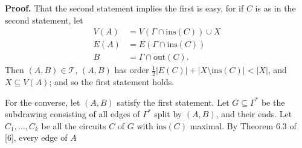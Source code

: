 \textbf{Proof.} That the second statement implies the first is easy, for if $C$ is as in the second statement, let
\begin{align*}
V(A) &= V(\Gamma \cap \text{ins}(C)) \cup X \\
E(A) &= E(\Gamma \cap \text{ins}(C)) \\
B &= \Gamma \cap \text{out}(C).
\end{align*}
Then $(A, B) \in \mathscr{T}$, $(A, B)$ has order $\frac{1}{2}|E(C)| + |X \setminus \text{ins}(C)| < |X|$, and $X \subseteq V(A)$; and so the first statement holds.

For the converse, let $(A, B)$ satisfy the first statement. Let $G \subseteq \Gamma^*$ be the subdrawing consisting of all edges of $\Gamma^*$ split by $(A, B)$, and their ends. Let $C_1, \dots, C_k$ be all the circuits $C$ of $G$ with $\text{ins}(C)$ maximal. By Theorem 6.3 of [6], every edge of $A$
